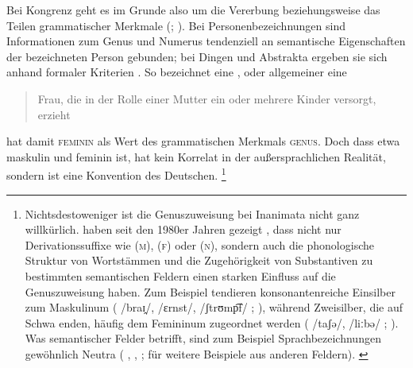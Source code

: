 Bei Kongrenz geht es im Grunde also um die Vererbung beziehungsweise das Teilen
grammatischer Merkmale (; \cite{corbett2012}). Bei
Personenbezeichnungen sind Informationen zum Genus und Numerus tendenziell an
semantische Eigenschaften der bezeichneten Person gebunden; bei Dingen und
Abstrakta ergeben sie sich anhand formaler Kriterien \autocites[vgl.][2--4,
125--132]{corbett2006}{koepckezubin2017}. So bezeichnet  eine
, oder allgemeiner
eine \blockcquote[s.\,v.~]{duden-online}{Frau, die in der Rolle
einer Mutter ein oder mehrere Kinder versorgt, erzieht}.  hat damit
\textsc{feminin} als Wert des grammatischen Merkmals \textsc{genus}. Doch dass
etwa  maskulin und  feminin ist, hat kein Korrelat in der
außersprachlichen Realität, sondern ist eine Konvention des Deutschen.%
%
	\footnote{Nichtsdestoweniger ist die Genuszuweisung bei Inanimata nicht
		ganz willkürlich. \citeauthor{koepckezubin2017} haben seit den 1980er
		Jahren gezeigt
		\autocites[z.\,B.][]%
			{koepcke1982}%
			{koepckezubin1996}%
			{koepckezubin2009}%
			{koepckezubin2017},
		dass nicht nur Derivationssuffixe wie
			 (\textsc{m}),
			 (\textsc{f}) oder
			 (\textsc{n}),
		sondern auch die phonologische Struktur von Wortstämmen und die
		Zugehörigkeit von Substantiven zu bestimmten semantischen Feldern einen
		starken Einfluss auf die Genuszuweisung haben. Zum Beispiel tendieren
		konsonantenreiche Einsilber zum Maskulinum (%
			 /braɪ̯/,
			 /ɛrnst/,
			 /ʃtrʊmp͡f/%
			;
		\cite[vgl.][475--479]{koepckezubin1996}), während Zweisilber, die auf
		Schwa enden, häufig dem Femininum zugeordnet werden (%
			 /taʃə/,
			 /liːbə/%
			;
		\cite[vgl.][207--209]{koepckezubin2017}). Was semantischer Felder
		betrifft, sind zum Beispiel Sprachbezeichnungen gewöhnlich Neutra (%
			,
			,
			;
		\cites[vgl.]%
			[480]{koepckezubin1996}%
			[137--139]{koepckezubin2009}%
			[210--214]{koepckezubin2017}
		für weitere Beispiele aus anderen Feldern).%
		\label{fn:koepckezubin}
	}

